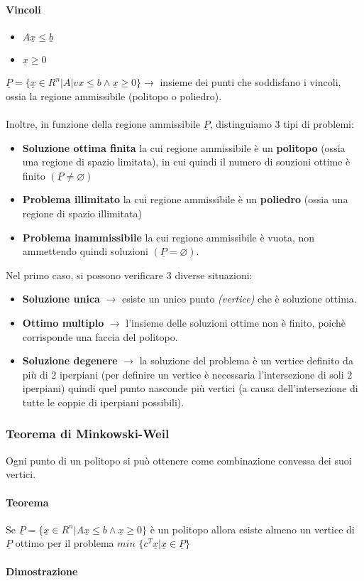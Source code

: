 \documentclass[12pt, twoside, letterpaper]{article}
\newcommand{\vp}[0]{
	\underline{P}
}
\newcommand{\vx}[0]{
	\underline{x}
}
\begin{document}
				\paragraph{Vincoli} 
				\begin{itemize}
					\item $A \vx \leq \underline{b}$
					\item $\vx \geq 0$		
				\end{itemize}
				$\underline{P} = \{ \vx \in R^n | A |vx \leq b \land \vx \geq 0 \} \rightarrow$ insieme dei punti che soddisfano i vincoli, ossia la regione ammissibile (politopo o poliedro).\\\\
				Inoltre, in funzione della regione ammissibile $\underline{P}$, distinguiamo 3 tipi di problemi: 
				\begin{itemize}
					\item \textbf{Soluzione ottima finita} la cui regione ammissibile è un \textbf{politopo} (ossia una regione di spazio limitata), in cui quindi il numero di souzioni ottime è finito $(\underline{P} \ne \varnothing)$
					\item \textbf{Problema illimitato} la cui regione ammissibile è un \textbf{poliedro} (ossia una regione di spazio illimitata)
					\item \textbf{Problema inammissibile} la cui regione ammissibile è vuota, non ammettendo quindi soluzioni $(\underline{P} = \varnothing)$.
				\end{itemize}
				Nel primo caso, si possono verificare 3 diverse situazioni:
				\begin{itemize}
					\item \textbf{Soluzione unica} $\rightarrow$ esiste un unico punto \textit{(vertice)} che è soluzione ottima.
					\item \textbf{Ottimo multiplo} $\rightarrow$ l'insieme delle soluzioni ottime non è finito, poichè corrisponde una faccia del politopo. 
					\item \textbf{Soluzione degenere} $\rightarrow$ la soluzione  del problema è un vertice definito da più di 2 iperpiani (per definire un vertice è necessaria l'intersezione di soli 2 iperpiani) quindi quel punto nasconde più vertici (a causa dell'intersezione di tutte le coppie di iperpiani possibili).
				\end{itemize}
				
			\subsubsection{Teorema di Minkowski-Weil}
				Ogni punto di un politopo si può ottenere come combinazione convessa dei suoi vertici. 
				\paragraph{Teorema} Se $\vp = \{ \vx \in R^n | A \vx \leq b \land \vx \geq 0 \}$ è un politopo allora esiste almeno un vertice di $\vp$ ottimo per il problema $min$ $\{ c^T \vx | \vx \in \vp \}$
				
				\paragraph{Dimostrazione}
				
				
\end{document}
